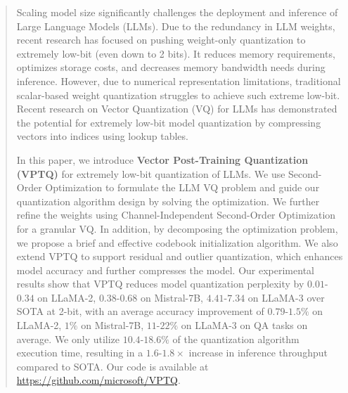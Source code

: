 \begin{abstract}
Scaling model size significantly challenges the deployment and inference of Large Language Models (LLMs). 
Due to the redundancy in LLM weights, recent research has focused on pushing weight-only quantization to extremely low-bit (even down to 2 bits). 
It reduces memory requirements, optimizes storage costs, and decreases memory bandwidth needs during inference. 
However, due to numerical representation limitations, traditional scalar-based weight quantization struggles to achieve such extreme low-bit.
Recent research on Vector Quantization (VQ) for LLMs has demonstrated the potential for extremely low-bit model quantization by compressing vectors into indices using lookup tables. 


In this paper, we introduce \textbf{Vector Post-Training Quantization (VPTQ)} for extremely low-bit quantization of LLMs. 
We use Second-Order Optimization to formulate the LLM VQ problem and guide our quantization algorithm design by solving the optimization.
We further refine the weights using Channel-Independent Second-Order Optimization for a granular VQ.
In addition, by decomposing the optimization problem, we propose a brief and effective codebook initialization algorithm. 
We also extend VPTQ to support residual and outlier quantization, which enhances model accuracy and further compresses the model.
Our experimental results show that VPTQ reduces model quantization perplexity by $0.01$-$0.34$ on LLaMA-2, $0.38$-$0.68$ on Mistral-7B, $4.41$-$7.34$ on LLaMA-3 over SOTA at 2-bit, with an average accuracy improvement of $0.79$-$1.5\%$ on LLaMA-2, $1\%$ on Mistral-7B, $11$-$22\%$ on LLaMA-3 on QA tasks on average. 
We only utilize $10.4$-$18.6\%$ of the quantization algorithm execution time, resulting in a $1.6$-$1.8\times$ increase in inference throughput compared to SOTA. 
Our code is available at \url{https://github.com/microsoft/VPTQ}.




\end{abstract}